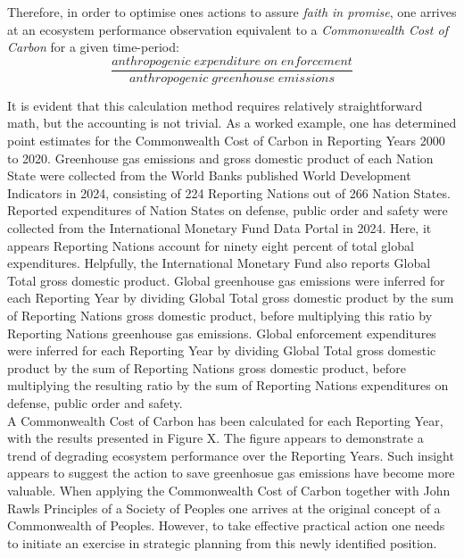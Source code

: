 \documentclass[11pt, oneside]{article}   	%
\begin{document}
Therefore, in order to optimise ones actions to assure \emph{faith in promise}, one arrives at an ecosystem performance observation equivalent to a \emph{Commonwealth Cost of Carbon} for a given time-period:\\

\begin{equation}
	\frac{anthropogenic\; expenditure\; on\; enforcement}{anthropogenic\; greenhouse\; emissions}
\end{equation}

It is evident that this calculation method requires relatively straightforward math, but the accounting is not trivial.
As a worked example, one has determined point estimates for the Commonwealth Cost of Carbon in Reporting Years 2000 to 2020.
Greenhouse gas emissions and gross domestic product of each Nation State were collected from the World Banks published World Development Indicators in 2024, consisting of 224 Reporting Nations out of 266 Nation States.
Reported expenditures of Nation States on defense, public order and safety were collected from the International Monetary Fund Data Portal in 2024.
Here, it appears Reporting Nations account for ninety eight percent of total global expenditures.
Helpfully, the International Monetary Fund also reports Global Total gross domestic product.
Global greenhouse gas emissions were inferred for each Reporting Year by dividing Global Total gross domestic product by the sum of Reporting Nations gross domestic product, before multiplying this ratio by Reporting Nations greenhouse gas emissions.
Global enforcement expenditures were inferred for each Reporting Year by dividing Global Total gross domestic product by the sum of Reporting Nations gross domestic product, before multiplying the resulting ratio by the sum of Reporting Nations expenditures on defense, public order and safety.\\

A Commonwealth Cost of Carbon has been calculated for each Reporting Year, with the results presented in Figure X.
The figure appears to demonstrate a trend of degrading ecosystem performance over the Reporting Years.
Such insight appears to suggest the action to save greenhosue gas emissions have become more valuable.
When applying the Commonwealth Cost of Carbon together with John Rawls Principles of a Society of Peoples one arrives at the original concept of a Commonwealth of Peoples.
However, to take effective practical action one needs to initiate an exercise in strategic planning from this newly identified position.\\
\end{document}
